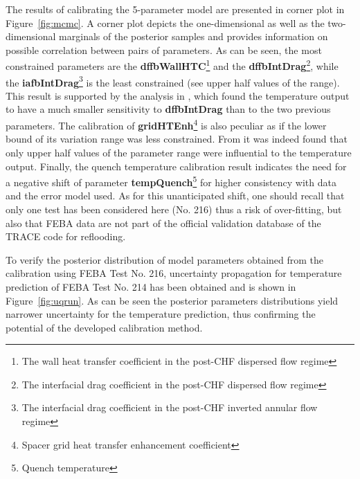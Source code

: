 \documentclass[11pt,titlepage]{article}
\begin{document}
The results of calibrating the 5-parameter model are presented in corner 
plot in Figure~\ref{fig:mcmc}. 
A corner plot depicts the one-dimensional 
as well as the two-dimensional marginals of the posterior samples and provides 
information on possible correlation between pairs of parameters. 
As can be seen, the most constrained parameters are the 
\textbf{dffbWallHTC}\footnote{The wall heat transfer coefficient in the post-CHF dispersed flow regime}  
and the \textbf{dffbIntDrag}\footnote{The interfacial drag coefficient in the post-CHF dispersed flow regime}, 
while the \textbf{iafbIntDrag}\footnote{The interfacial drag coefficient in the post-CHF inverted annular flow regime} 
is the least constrained (see upper half values of the range).
This result is supported by the analysis in \cite{Wicaksono2016a}, 
which found the temperature output to have a much smaller sensitivity to 
\textbf{dffbIntDrag} than to the two previous parameters. 
The calibration of \textbf{gridHTEnh}\footnote{Spacer grid heat transfer enhancement coefficient} 
is also peculiar as if the lower bound of its variation range was less 
constrained.
From \cite{Wicaksono2016} it was indeed found that only upper half values of 
the parameter range were influential to the temperature output. 
Finally, the quench temperature calibration result indicates the need for a 
negative shift of parameter \textbf{tempQuench}\footnote{Quench temperature} 
for higher consistency with data and the error model used. 
As for this unanticipated shift, one should recall that only one test 
has been considered here (No. 216) thus a risk of over-fitting, 
but also that FEBA data are not part of the official validation database of 
the TRACE code for reflooding. 

To verify the posterior distribution of model parameters obtained from the 
calibration using FEBA Test No. 216, uncertainty propagation for temperature 
prediction of FEBA Test No. 214 has been obtained and is shown in 
Figure~\ref{fig:uqrun}. 
As can be seen the posterior parameters distributions yield narrower 
uncertainty for the temperature prediction, thus confirming the potential 
of the developed calibration method.
\end{document}
